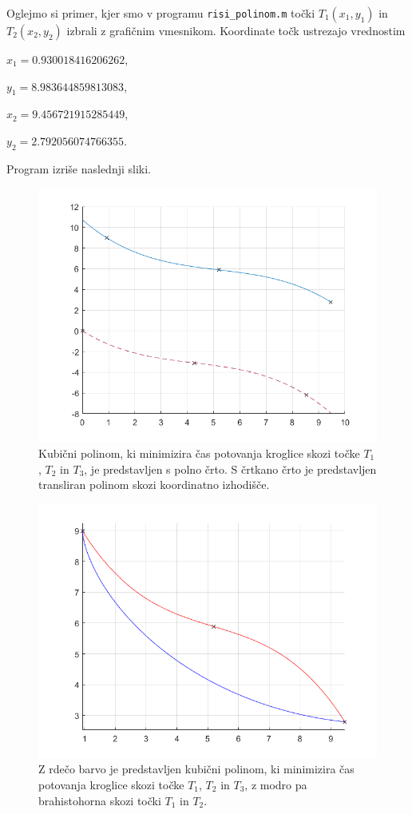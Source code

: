 \documentclass[a4paper]{article}
\begin{document}
Oglejmo si primer, kjer smo v programu \texttt{risi\_polinom.m} točki $T_1(x_1,y_1)$ in $T_2(x_2,y_2)$ izbrali z grafičnim vmesnikom. Koordinate točk ustrezajo vrednostim

$x_1 = 0.930018416206262$,

$y_1 = 8.983644859813083$,

$x_2 = 9.456721915285449$,

$y_2 = 2.792056074766355$.

Program izriše naslednji sliki.

\begin{figure}[h!]
\includegraphics[scale=0.6]{primer1-polinom.png}
\caption{Kubični polinom, ki minimizira čas potovanja kroglice skozi točke $T_1$, $T_2$ in $T_3$, je predstavljen s polno črto. S črtkano črto je predstavljen transliran polinom skozi koordinatno izhodišče.}
\end{figure}

\begin{figure}[h!]
\includegraphics[scale=0.6]{primer1-PolBrah.png}
\caption{Z rdečo barvo je predstavljen kubični polinom, ki minimizira čas potovanja kroglice skozi točke $T_1$, $T_2$ in $T_3$, z modro pa brahistohorna skozi točki $T_1$ in $T_2$.}
\end{figure}
\end{document}
